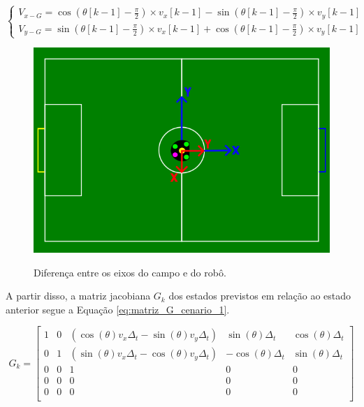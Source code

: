 \documentclass[acronym, symbols, table]{fei}
\begin{document}
				\begin{equation}\label{eq:calculo_velocidades_globais}
					\begin{cases}
						V_{x-G} = \cos(\theta[k-1] - \frac{\pi}{2}) \times v_x[k-1] - \sin(\theta[k-1] - \frac{\pi}{2}) \times v_y[k-1] \\
						V_{y-G} = \sin(\theta[k-1] - \frac{\pi}{2}) \times v_x[k-1] + \cos(\theta[k-1] - \frac{\pi}{2}) \times v_y[k-1]
					\end{cases}
				\end{equation}
			
			\begin{figure}[!htb]
				\centering
				\caption{Diferença entre os eixos do campo e do robô.}
				\includegraphics[width=1.0\textwidth]{representacao_eixos_robo_campo.png}
				\label{fig:representacao_eixos_robo_campo}
			\end{figure}
		
			 A partir disso, a matriz jacobiana $G_k$ dos estados previstos em relação ao estado anterior segue a Equação \ref{eq:matriz_G_cenario_1}.
		
			\begin{equation}\label{eq:matriz_G_cenario_1}
			 	G_{k} = \begin{bmatrix}
			 		1 & 0 & (\cos(\theta)v_x\Delta_t - \sin(\theta)v_y\Delta_t) & \sin(\theta)\Delta_t & \cos(\theta)\Delta_t \\
			 		0 & 1 & (\sin(\theta)v_x\Delta_t - \cos(\theta)v_y\Delta_t) & -\cos(\theta)\Delta_t & \sin(\theta)\Delta_t \\
			 		0 & 0 & 1 & 0 & 0 \\
			 		0 & 0 & 0 & 0 & 0 \\
			 		0 & 0 & 0 & 0 & 0 \\
			 	\end{bmatrix}
			 \end{equation}
		 
\end{document}
